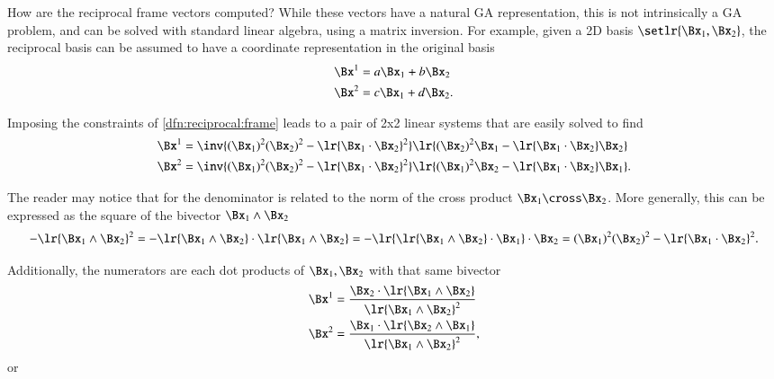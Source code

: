 %
%
How are the reciprocal frame vectors computed?  While these vectors have a natural GA representation, this is not intrinsically a GA problem, and can be solved with standard linear algebra, using a matrix inversion.
For example, given a 2D basis \( \setlr{ \Bx_1, \Bx_2 } \), the reciprocal basis can be assumed to have a coordinate representation in the original basis
\begin{dmath}\label{eqn:reciprocal_R2:100}
\begin{aligned}
\Bx^1 &= a \Bx_1 + b \Bx_2 \\
\Bx^2 &= c \Bx_1 + d \Bx_2.
\end{aligned}
\end{dmath}

Imposing the constraints of \cref{dfn:reciprocal:frame} leads to a pair of 2x2 linear systems that are easily solved to find
\begin{dmath}\label{eqn:reciprocal_R2:120}
\begin{aligned}
\Bx^1 &= \inv{ (\Bx_1)^2 (\Bx_2)^2 - \lr{ \Bx_1 \cdot \Bx_2}^2 } \lr{ (\Bx_2)^2 \Bx_1 - \lr{ \Bx_1 \cdot \Bx_2 } \Bx_2 } \\
\Bx^2 &= \inv{ (\Bx_1)^2 (\Bx_2)^2 - \lr{ \Bx_1 \cdot \Bx_2}^2 } \lr{ (\Bx_1)^2 \Bx_2 - \lr{ \Bx_1 \cdot \Bx_2 } \Bx_1 }.
\end{aligned}
\end{dmath}

The reader may notice that for  the denominator is related to the norm of the cross product \( \Bx_1 \cross \Bx_2 \).
More generally, this can be expressed as the square of the bivector \( \Bx_1 \wedge \Bx_2 \)
\begin{dmath}\label{eqn:reciprocal_R2:140}
-\lr{\Bx_1 \wedge \Bx_2 }^2
=
-\lr{\Bx_1 \wedge \Bx_2 } \cdot \lr{\Bx_1 \wedge \Bx_2 }
=
-\lr{ \lr{\Bx_1 \wedge \Bx_2 } \cdot \Bx_1 } \cdot \Bx_2
=
(\Bx_1)^2 (\Bx_2)^2 - \lr{\Bx_1 \cdot \Bx_2}^2.
\end{dmath}

Additionally, the numerators are each dot products of \( \Bx_1, \Bx_2 \) with that same bivector
\begin{dmath}\label{eqn:reciprocal_R2:160}
\begin{aligned}
\Bx^1 &= \frac{\Bx_2 \cdot \lr{ \Bx_1 \wedge \Bx_2 } }{ \lr{ \Bx_1 \wedge \Bx_2}^2 } \\
\Bx^2 &= \frac{\Bx_1 \cdot \lr{ \Bx_2 \wedge \Bx_1 } }{ \lr{ \Bx_1 \wedge \Bx_2}^2 },
\end{aligned}
\end{dmath}
or


